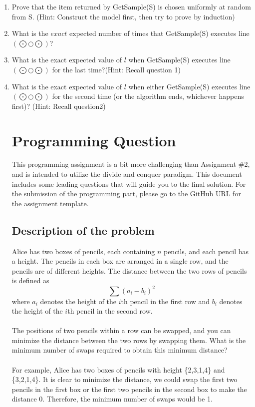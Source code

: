 \documentclass{article}
\begin{document}
\begin{enumerate}
    \item Prove that the item returned by GetSample(S) is chosen uniformly at random from S. (Hint: Construct the model first, then try to prove by induction)
    \newpage

    \item What is the $exact$ expected number of times that GetSample(S) executes line $(\bigodot \bigcirc \bigodot)$? 
    \newpage
    \item What is the exact expected value of $l$ when GetSample(S) executes line $(\bigodot \bigcirc \bigodot)$ for the last time?(Hint: Recall question 1)
    \newpage
    \item What is the exact expected value of $l$ when either GetSample(S) executes line $(\bigodot \bigcirc \bigodot)$ for the second time (or the algorithm ends, whichever happens first)? (Hint: Recall question2)
    \newpage
    \section{Programming Question}
    This programming assignment is a bit more challenging than Assignment \#2, and is intended to utilize the divide and conquer paradigm. This document includes some leading questions that will guide you to the final solution. For the submission of the programming part, please go to the GitHub URL for the assignment template.
    \subsection{Description of the problem}
    Alice has two boxes of pencils, each containing $n$ pencils, and each pencil has a height. The pencils in each box are arranged in a single row, and the pencils are of different heights. The distance between the two rows of pencils is defined as $$\sum (a_i-b_i)^2$$
    where $a_i$ denotes the height of the $i$th pencil in the first row and $b_i$ denotes the height of the $i$th pencil in the second row.\\
    \\
    The positions of two pencils within a row can be swapped, and you can minimize the distance between the two rows by swapping them. What is the minimum number of swaps required to obtain this minimum distance?\\
    \\
    For example, Alice has two boxes of pencils with height \{2,3,1,4\} and \{3,2,1,4\}. It is clear to minimize the distance, we could swap the first two pencils in the first box or the first two pencils in the second box to make the distance 0. Therefore, the minimum number of swaps would be 1.

\end{enumerate}
\end{document}
